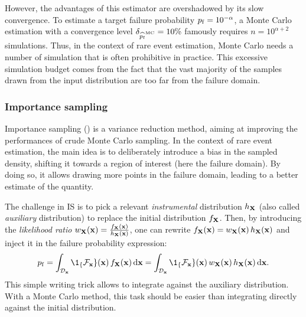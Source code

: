 However, the advantages of this estimator are overshadowed by its slow convergence. 
To estimate a target failure probability $p_\mathrm{f}=10^{-\alpha}$, 
a Monte Carlo estimation with a convergence level $\delta_{\widehat{p_\mathrm{f}}^{\textrm{MC}}} = 10\%$ famously requires $n=10^{\alpha + 2}$ simulations. 
Thus, in the context of rare event estimation, Monte Carlo needs a number of simulation that is often prohibitive in practice. 
This excessive simulation budget comes from the fact that the vast majority of the samples drawn from the input distribution are too far from the failure domain.


\subsubsection{Importance sampling}

Importance sampling () is a variance reduction method, aiming at improving the performances of crude Monte Carlo sampling. 
In the context of rare event estimation, the main idea is to deliberately introduce a bias in the sampled density, shifting it towards a region of interest (here the failure domain). 
By doing so, it allows drawing more points in the failure domain, leading to a better estimate of the quantity.

The challenge in IS is to pick a relevant \textit{instrumental} distribution $h_{\bf X}$ (also called \textit{auxiliary} distribution) to replace the initial distribution $f_{\bf X}$. 
Then, by introducing the \textit{likelihood ratio} $w_{\bf X}({\bf x}) = \frac{f_{\bf X}({\bf x})}{h_{\bf X}({\bf x})}$, one can rewrite $f_{\bf X}({\bf x}) = w_{\bf X}({\bf x}) \, h_{\bf X}({\bf x})$ and inject it in the failure probability expression: 
\begin{equation}
    \pf = \int_{\iD_\bx} \1_\{\iF_\bx\}(\bx) \, f_\bX(\bx) \, \dd\bx
        = \int_{\iD_\bx} \1_\{\iF_\bx\}(\bx) \, w_\bX(\bx) \, h_\bX(\bx) \, \dd\bx.
\end{equation}
This simple writing trick allows to integrate against the auxiliary distribution. 
With a Monte Carlo method, this task should be easier than integrating directly against the initial distribution.

